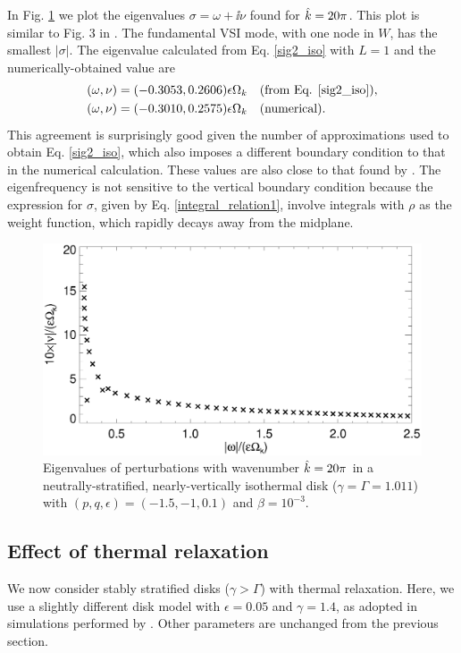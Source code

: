 In Fig. \ref{lowfreq_eigen} we plot the eigenvalues 
$\sigma = \omega + \ii\nu$ found for $\hat{k}=20\pi$. This plot is
similar to Fig. 3 in \cite{mcnally14}. The fundamental
VSI mode, with one node in $W$, has the smallest $|\sigma|$. The
eigenvalue calculated from Eq. \ref{sig2_iso} with $L=1$ and the 
numerically-obtained value are  
\begin{align*}
  (\omega,\nu) = (-0.3053,0.2606)\epsilon\Omega_k &\quad \text{(from
    Eq. \ref{sig2_iso})},\\
  (\omega,\nu) = (-0.3010,0.2575) \epsilon \Omega_k &\quad \text{(numerical)}.
\end{align*}
This agreement is surprisingly good given the number of approximations
used to obtain Eq. \ref{sig2_iso}, which also imposes a different
boundary condition to that in the numerical calculation. These values
are also close to that found by \cite{mcnally14}. The eigenfrequency
is not sensitive to the vertical boundary condition because the
expression for $\sigma$, given by Eq. \ref{integral_relation1},
involve integrals with $\rho$ as the   weight function, which rapidly
decays away from the midplane. 

\begin{figure}
  \includegraphics[width=\linewidth]{figures/eigenvalues_iso}
  \caption{Eigenvalues of perturbations with wavenumber $\hat{k}=20\pi$
    in a neutrally-stratified, nearly-vertically isothermal disk
    ($\gamma=\Gamma=1.011$) with $(p,q,\epsilon)=(-1.5,-1,0.1)$ and
    $\beta=10^{-3}$. \label{lowfreq_eigen} 
  }
\end{figure}

\subsection{Effect of thermal relaxation}
We now consider stably stratified disks ($\gamma > \Gamma$) with
thermal relaxation. Here, we use a slightly  
different disk model with $\epsilon=0.05$ and $\gamma=1.4$, as 
adopted in simulations performed by \cite{nelson13}. Other parameters 
are unchanged from the previous section.  

